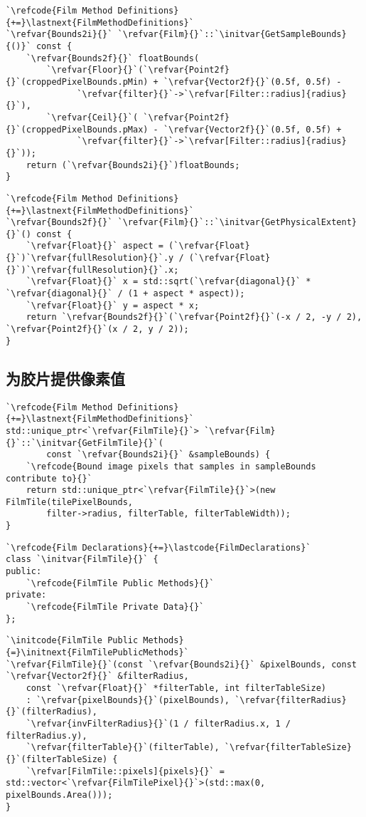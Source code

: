 \begin{lstlisting}
`\refcode{Film Method Definitions}{+=}\lastnext{FilmMethodDefinitions}`
`\refvar{Bounds2i}{}` `\refvar{Film}{}`::`\initvar{GetSampleBounds}{()}` const {
    `\refvar{Bounds2f}{}` floatBounds(
        `\refvar{Floor}{}`(`\refvar{Point2f}{}`(croppedPixelBounds.pMin) + `\refvar{Vector2f}{}`(0.5f, 0.5f) -
              `\refvar{filter}{}`->`\refvar[Filter::radius]{radius}{}`),
        `\refvar{Ceil}{}`( `\refvar{Point2f}{}`(croppedPixelBounds.pMax) - `\refvar{Vector2f}{}`(0.5f, 0.5f) +
              `\refvar{filter}{}`->`\refvar[Filter::radius]{radius}{}`));
    return (`\refvar{Bounds2i}{}`)floatBounds;
}
\end{lstlisting}
\begin{lstlisting}
`\refcode{Film Method Definitions}{+=}\lastnext{FilmMethodDefinitions}`
`\refvar{Bounds2f}{}` `\refvar{Film}{}`::`\initvar{GetPhysicalExtent}{}`() const {
    `\refvar{Float}{}` aspect = (`\refvar{Float}{}`)`\refvar{fullResolution}{}`.y / (`\refvar{Float}{}`)`\refvar{fullResolution}{}`.x;
    `\refvar{Float}{}` x = std::sqrt(`\refvar{diagonal}{}` * `\refvar{diagonal}{}` / (1 + aspect * aspect));
    `\refvar{Float}{}` y = aspect * x;
    return `\refvar{Bounds2f}{}`(`\refvar{Point2f}{}`(-x / 2, -y / 2), `\refvar{Point2f}{}`(x / 2, y / 2));
}
\end{lstlisting}
\subsection{为胶片提供像素值}\label{sub:为胶片提供像素值}
\begin{lstlisting}
`\refcode{Film Method Definitions}{+=}\lastnext{FilmMethodDefinitions}`
std::unique_ptr<`\refvar{FilmTile}{}`> `\refvar{Film}{}`::`\initvar{GetFilmTile}{}`(
        const `\refvar{Bounds2i}{}` &sampleBounds) {
    `\refcode{Bound image pixels that samples in sampleBounds contribute to}{}`
    return std::unique_ptr<`\refvar{FilmTile}{}`>(new FilmTile(tilePixelBounds,
        filter->radius, filterTable, filterTableWidth));
}
\end{lstlisting}

\begin{lstlisting}
`\refcode{Film Declarations}{+=}\lastcode{FilmDeclarations}`
class `\initvar{FilmTile}{}` {
public:
    `\refcode{FilmTile Public Methods}{}`
private:
    `\refcode{FilmTile Private Data}{}`
};
\end{lstlisting}

\begin{lstlisting}
`\initcode{FilmTile Public Methods}{=}\initnext{FilmTilePublicMethods}`
`\refvar{FilmTile}{}`(const `\refvar{Bounds2i}{}` &pixelBounds, const `\refvar{Vector2f}{}` &filterRadius,
    const `\refvar{Float}{}` *filterTable, int filterTableSize)
    : `\refvar{pixelBounds}{}`(pixelBounds), `\refvar{filterRadius}{}`(filterRadius),
    `\refvar{invFilterRadius}{}`(1 / filterRadius.x, 1 / filterRadius.y),
    `\refvar{filterTable}{}`(filterTable), `\refvar{filterTableSize}{}`(filterTableSize) {
    `\refvar[FilmTile::pixels]{pixels}{}` = std::vector<`\refvar{FilmTilePixel}{}`>(std::max(0, pixelBounds.Area()));
}
\end{lstlisting}

